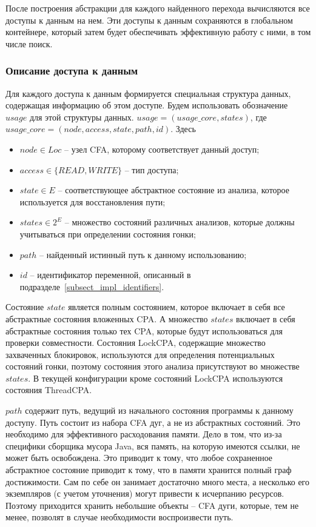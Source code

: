 После построения абстракции для каждого найденного перехода вычисляются все доступы к данным на нем.
Эти доступы к данным сохраняются в глобальном контейнере, который затем будет обеспечивать эффективную работу с ними, в том числе поиск.

\subsubsection{Описание доступа к данным}

Для каждого доступа к данным формируется специальная структура данных, содержащая информацию об этом доступе. 
Будем использовать обозначение $usage$ для этой структуры данных.
$usage = (usage\_core, states)$, где $usage\_core = (node, access, state, path, id)$. Здесь 

\begin{itemize}
\item $node \in Loc$ -- узел CFA, которому соответствует данный доступ;
\item $access \in \{READ, WRITE\}$ -- тип доступа;
\item $state \in E$ -- соответствующее абстрактное состояние из анализа, которое используется для восстановления пути;
\item $states \in 2^E$ -- множество состояний различных анализов, которые должны учитываться при определении состояния гонки;
\item $path$ -- найденный истинный путь к данному использованию;
\item $id$ -- идентификатор переменной, описанный в подразделе~\ref{subsect_impl_identifiers}.
\end{itemize}

Состояние $state$ является полным состоянием, которое включает в себя все абстрактные состояния вложенных CPA. 
А множество $states$ включает в себя абстрактные состояния только тех CPA, которые будут использоваться для проверки совместности.
Состояния LockCPA, содержащие множество захваченных блокировок, используются для определения потенциальных состояний гонки, поэтому состояния этого анализа присутствуют во множестве $states$. 
В текущей конфигурации кроме состояний LockCPA используются состояния ThreadCPA. 

$path$ содержит путь, ведущий из начального состояния программы к данному доступу.
Путь состоит из набора CFA дуг, а не из абстрактных состояний. Это необходимо для эффективного расходования памяти.
Дело в том, что из-за специфики сборщика мусора Java, вся память, на которую имеются ссылки, не может быть освобождена.
Это приводит к тому, что любое сохраненное абстрактное состояние приводит к тому, что в памяти хранится полный граф достижимости.
Сам по себе он занимает достаточно много места, а несколько его экземпляров (с учетом уточнения) могут привести к исчерпанию ресурсов.
Поэтому приходится хранить небольшие объекты -- CFA дуги, которые, тем не менее, позволят в случае необходимости воспроизвести путь.

